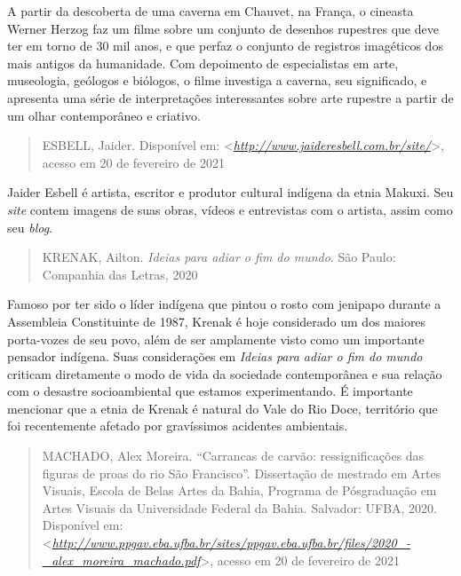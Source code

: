 \documentclass{extarticle}
\begin{document}
    A partir da descoberta de uma caverna em Chauvet, na França, o
    cineasta Werner Herzog faz um filme sobre um conjunto de desenhos
    rupestres que deve ter em torno de 30 mil anos, e que perfaz o
    conjunto de registros imagéticos dos mais antigos da humanidade. Com
    depoimento de especialistas em arte, museologia, geólogos e
    biólogos, o filme investiga a caverna, seu significado, e apresenta
    uma série de interpretações interessantes sobre arte rupestre a
    partir de um olhar contemporâneo e criativo.

    \begin{quote}
    ESBELL, Jaider. Disponível em:
    \textless{}\href{http://www.jaideresbell.com.br/site/}{\emph{http://www.jaideresbell.com.br/site/}}\textgreater{},
    acesso em 20 de fevereiro de 2021
    \end{quote}

    Jaider Esbell é artista, escritor e produtor cultural indígena da
    etnia Makuxi. Seu \emph{site} contem imagens de suas obras, vídeos e
    entrevistas com o artista, assim como seu \emph{blog}.

    \begin{quote}
    KRENAK, Ailton. \emph{Ideias para adiar o fim do mundo}. São Paulo:
    Companhia das Letras, 2020
    \end{quote}

    Famoso por ter sido o líder indígena que pintou o rosto com jenipapo
    durante a Assembleia Constituinte de 1987, Krenak é hoje considerado
    um dos maiores porta-vozes de seu povo, além de ser amplamente visto
    como um importante pensador indígena. Suas considerações em
    \emph{Ideias para adiar o fim do mundo} criticam diretamente o modo
    de vida da sociedade contemporânea e sua relação com o desastre
    socioambiental que estamos experimentando. É importante mencionar
    que a etnia de Krenak é natural do Vale do Rio Doce, território que
    foi recentemente afetado por gravíssimos acidentes ambientais.

    \begin{quote}
    MACHADO, Alex Moreira. ``Carrancas de carvão: ressignificações das
    figuras de proas do rio São Francisco''. Dissertação de mestrado em
    Artes Visuais, Escola de Belas Artes da Bahia, Programa de
    Pósgraduação em Artes Visuais da Universidade Federal da Bahia.
    Salvador: UFBA, 2020. Disponível em:
    \textless{}\href{http://www.ppgav.eba.ufba.br/sites/ppgav.eba.ufba.br/files/2020_-_alex_moreira_machado.pdf}{\emph{http://www.ppgav.eba.ufba.br/sites/ppgav.eba.ufba.br/files/2020\_-\_alex\_moreira\_machado.pdf}}\textgreater{},
    acesso em 20 de fevereiro de 2021
    \end{quote}
\end{document}

